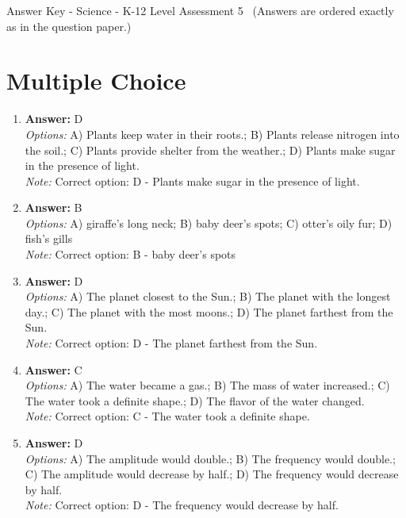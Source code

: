 \documentclass[12pt]{article}
\begin{document}
\begin{center}
Answer Key - Science - K-12 Level Assessment 5 \
\small (Answers are ordered exactly as in the question paper.)
\end{center}

\section*{Multiple Choice}
\begin{enumerate}[label=\arabic*.]
\item \textbf{Answer:} D
\\ \textit{Options:} A) Plants keep water in their roots.; B) Plants release nitrogen into the soil.; C) Plants provide shelter from the weather.; D) Plants make sugar in the presence of light.
\\ \textit{Note:} Correct option: D - Plants make sugar in the presence of light.
\item \textbf{Answer:} B
\\ \textit{Options:} A) giraffe's long neck; B) baby deer's spots; C) otter's oily fur; D) fish's gills
\\ \textit{Note:} Correct option: B - baby deer's spots
\item \textbf{Answer:} D
\\ \textit{Options:} A) The planet closest to the Sun.; B) The planet with the longest day.; C) The planet with the most moons.; D) The planet farthest from the Sun.
\\ \textit{Note:} Correct option: D - The planet farthest from the Sun.
\item \textbf{Answer:} C
\\ \textit{Options:} A) The water became a gas.; B) The mass of water increased.; C) The water took a definite shape.; D) The flavor of the water changed.
\\ \textit{Note:} Correct option: C - The water took a definite shape.
\item \textbf{Answer:} D
\\ \textit{Options:} A) The amplitude would double.; B) The frequency would double.; C) The amplitude would decrease by half.; D) The frequency would decrease by half.
\\ \textit{Note:} Correct option: D - The frequency would decrease by half.
\end{enumerate}
\end{document}
